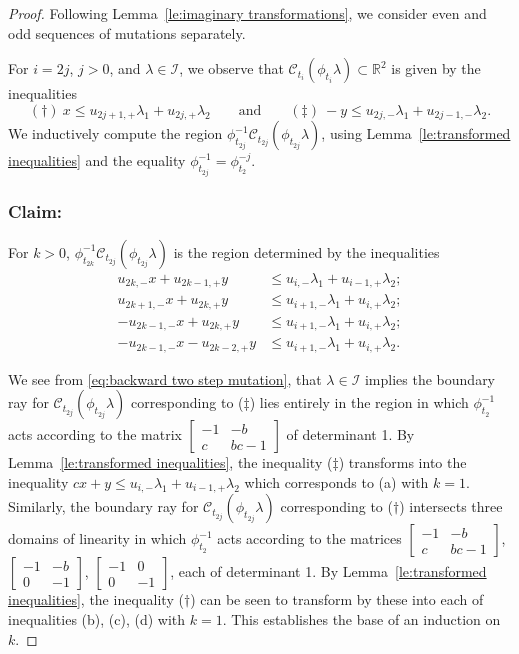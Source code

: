\documentclass{amsart}
\numberwithin{theorem}{section}
\newcommand{\cC}{\mathcal{C}}
\newcommand{\cI}{\mathcal{I}}
\newcommand{\RR}{\mathbb{R}}
\begin{document}
  \begin{proof}
    Following Lemma~\ref{le:imaginary transformations}, we consider even and odd sequences of mutations separately.

    For $i=2j$, $j>0$, and $\lambda\in\cI$, we observe that $\cC_{t_i}(\phi_{t_i}\lambda)\subset\RR^2$ is given by the inequalities 
    \[ (\dagger)\ x\le u_{2j+1,+}\lambda_1+u_{2j,+}\lambda_2 \qquad\text{and}\qquad (\ddagger)\ -y\le u_{2j,-}\lambda_1+u_{2j-1,-}\lambda_2. \]
    We inductively compute the region $\phi_{t_{2j}}^{-1}\cC_{t_{2j}}(\phi_{t_{2j}}\lambda)$, using Lemma~\ref{le:transformed inequalities} and the equality $\phi_{t_{2j}}^{-1}=\phi_{t_2}^{-j}$.

    \subsubsection*{Claim:} For $k>0$, $\phi_{t_{2k}}^{-1}\cC_{t_{2j}}(\phi_{t_{2j}}\lambda)$ is the region determined by the inequalities 
    \begin{align*}
      \tag{a} u_{2k,-}x+u_{2k-1,+}y &\le u_{i,-}\lambda_1+u_{i-1,+}\lambda_2;\\
      \tag{b} u_{2k+1,-}x+u_{2k,+}y &\le u_{i+1,-}\lambda_1+u_{i,+}\lambda_2;\\
      \tag{c} -u_{2k-1,-}x+u_{2k,+}y &\le u_{i+1,-}\lambda_1+u_{i,+}\lambda_2;\\
      \tag{d} -u_{2k-1,-}x-u_{2k-2,+}y &\le u_{i+1,-}\lambda_1+u_{i,+}\lambda_2.
    \end{align*}

    We see from \eqref{eq:backward two step mutation}, that $\lambda\in\cI$ implies the boundary ray for $\cC_{t_{2j}}(\phi_{t_{2j}}\lambda)$ corresponding to ($\ddagger$) lies entirely in the region in which $\phi_{t_2}^{-1}$ acts according to the matrix $\left[ \begin{array}{cc} -1 & -b\\ c & bc-1 \end{array}\right]$ of determinant 1.
    By Lemma~\ref{le:transformed inequalities}, the inequality ($\ddagger$) transforms into the inequality $cx+y\le u_{i,-}\lambda_1+u_{i-1,+}\lambda_2$ which corresponds to (a) with $k=1$.
    Similarly, the boundary ray for $\cC_{t_{2j}}(\phi_{t_{2j}}\lambda)$ corresponding to ($\dagger$) intersects three domains of linearity in which $\phi_{t_2}^{-1}$ acts according to the matrices $\left[ \begin{array}{cc} -1 & -b\\ c & bc-1 \end{array}\right]$, $\left[ \begin{array}{cc} -1 & -b\\ 0 & -1 \end{array}\right]$, $\left[ \begin{array}{cc} -1 & 0\\ 0 & -1 \end{array}\right]$, each of determinant 1.
    By Lemma~\ref{le:transformed inequalities}, the inequality ($\dagger$) can be seen to transform by these into each of inequalities (b), (c), (d) with $k=1$.
    This establishes the base of an induction on $k$.


\end{proof}
\end{document}
